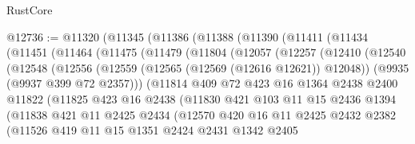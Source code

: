 \begin{lexlean}{RustCore}
\begin{coremodule}
@12736 := @11320
    (@11345
      (@11386
        (@11388
          (@11390
            (@11411
              (@11434
                (@11451
                  (@11464
                    (@11475
                      (@11479
                        (@11804
                          (@12057
                            (@12257
                              (@12410
                                (@12540
                                  (@12548
                                    (@12556
                                      (@12559 (@12565 (@12569 (@12616 @12621)) @12048))
                                      (@9935 (@9937 @399 @72 @2357)))
                                    (@11814
                                      @409
                                      @72
                                      @423
                                      @16
                                      @1364
                                      @2438
                                      @2400
                                      @11822
                                      (@11825
                                        @423
                                        @16
                                        @2438
                                        (@11830
                                          @421
                                          @103
                                          @11
                                          @15
                                          @2436
                                          @1394
                                          (@11838
                                            @421
                                            @11
                                            @2425
                                            @2434
                                            (@12570
                                              @420
                                              @16
                                              @11
                                              @2425
                                              @2432
                                              @2382
                                              (@11526
                                                @419
                                                @11
                                                @15
                                                @1351
                                                @2424
                                                @2431
                                                @1342
                                                @2405

\end{coremodule}
\end{lexlean}
